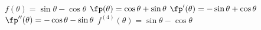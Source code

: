 {$f(\theta) = \sin\theta-\cos\theta$
}
{$\fp(\theta) = \cos\theta+\sin\theta$ $\fp'(\theta) = -\sin\theta+\cos\theta$ $\fp''(\theta) = -\cos\theta-\sin\theta$ $f^{(4)}(\theta) = \sin\theta-\cos\theta$
}

